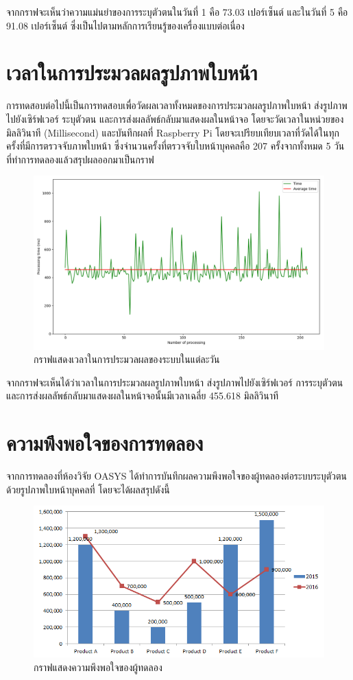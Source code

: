 \indent จากกราฟจะเห็นว่าความแม่นยำของการระบุตัวตนในวันที่ 1 คือ 73.03 เปอร์เซ็นต์ และในวันที่ 5 คือ 91.08 เปอร์เซ็นต์ ซึ่งเป็นไปตามหลักการเรียนรู้ของเครื่องแบบต่อเนื่อง


\section{เวลาในการประมวลผลรูปภาพใบหน้า}
การทดสอบต่อไปนี้เป็นการทดสอบเพื่อวัดผลเวลาทั้งหมดของการประมวลผลรูปภาพใบหน้า ส่งรูปภาพไปยังเซิร์ฟเวอร์ ระบุตัวตน และการส่งผลลัพธ์กลับมาแสดงผลในหน้าจอ
โดยจะวัดเวลาในหน่วยของมิลลิวินาที (Millisecond) และบันทึกผลที่ Raspberry Pi โดยจะเปรียบเทียบเวลาที่วัดได้ในทุกครั้งที่มีการตรวจจับภาพใบหน้า 
ซึ่งจำนวนครั้งที่ตรวจจับใบหน้าบุคคลคือ 207 ครั้งจากทั้งหมด 5 วันที่ทำการทดลองแล้วสรุปผลออกมาเป็นกราฟ
  
\begin{figure}[!ht]
  \begin{center}
    \includegraphics[scale=.5]{pic/Time.png}
    \caption[กราฟแสดงเวลาในการประมวลผลของระบบในแต่ละวัน]{กราฟแสดงเวลาในการประมวลผลของระบบในแต่ละวัน}
    \label{fig:time_graph}
  \end{center}
\end{figure}
\newpage
\indent จากกราฟจะเห็นได้ว่าเวลาในการประมวลผลรูปภาพใบหน้า ส่งรูปภาพไปยังเซิร์ฟเวอร์ การระบุตัวตน และการส่งผลลัพธ์กลับมาแสดงผลในหน้าจอนั้นมีเวลาเฉลี่ย 455.618 มิลลิวินาที



\section{ความพึงพอใจของการทดลอง}
จากการทดลองที่ห้องวิจัย OASYS ได้ทำการบันทึกผลความพึงพอใจของผู้ทดลองต่อระบบระบุตัวตนด้วยรูปภาพใบหน้าบุคคลที่ โดยจะได้ผลสรุปดังนี้

\begin{figure}[!ht]
    \begin{center}
      \includegraphics[scale=.5]{pic/bar_graph.png}
      \caption[กราฟแสดงความพึงพอใจของผู้ทดลอง]{กราฟแสดงความพึงพอใจของผู้ทดลอง}
      \label{fig:bar_graph}
    \end{center}
  \end{figure}
